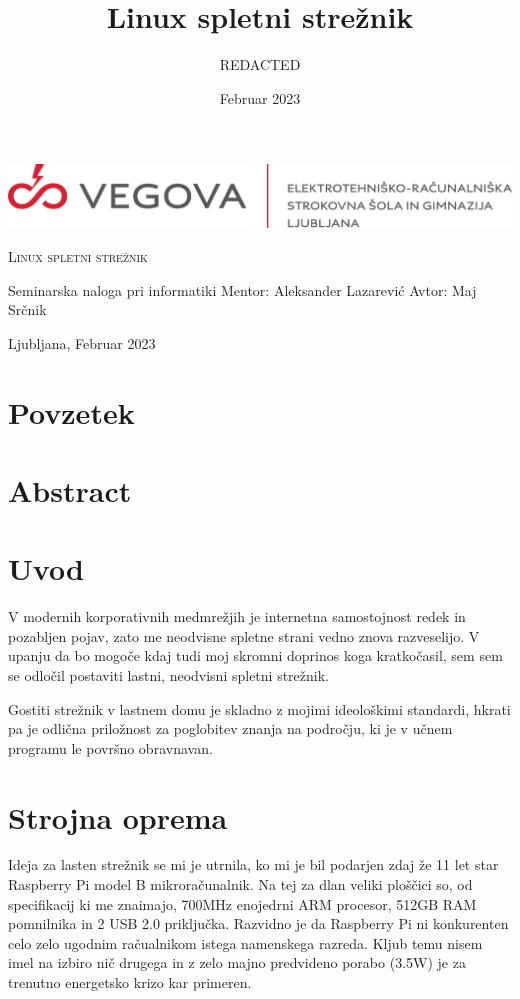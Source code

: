\documentclass[12pt, a4paper]{article}
\title{Linux spletni strežnik}
\author{REDACTED}
\date{Februar 2023}
\affil{Vegova Ljubljana}
\begin{document}
\begin{titlepage}
	\begin{center}
		\includegraphics[width=\textwidth]{slike/logotip_vegova_leze_brezokvirja.png}\par\vspace{6cm}
		{\scshape\huge Linux spletni strežnik}\par
		\large{Seminarska naloga pri informatiki}
		\vfill
		Mentor: Aleksander Lazarević \hfill Avtor: Maj Srčnik\par\vspace{1cm}
		Ljubljana, Februar 2023
	\end{center}
\end{titlepage}
\thispagestyle{empty}
\pagebreak
\tableofcontents
\pagebreak
\thispagestyle{empty}
\section*{Povzetek}
\section*{Abstract}
\pagebreak
\section{Uvod}
V modernih korporativnih medmrežjih je internetna samostojnost redek in pozabljen pojav, zato me neodvisne spletne strani vedno znova razveselijo.
V upanju da bo mogoče kdaj tudi moj skromni doprinos koga kratkočasil, sem sem se odločil postaviti lastni, neodvisni spletni strežnik.

Gostiti strežnik v lastnem domu je skladno z mojimi ideološkimi standardi, hkrati pa je odlična priložnost za poglobitev znanja na področju, ki je v učnem programu le površno obravnavan.

\section{Strojna oprema}
Ideja za lasten strežnik se mi je utrnila, ko mi je bil podarjen zdaj že 11 let star Raspberry Pi model B mikroračunalnik.
Na tej za dlan veliki ploščici so, od specifikacij ki me znaimajo, 700MHz enojedrni ARM procesor, 512GB RAM pomnilnika in 2 USB 2.0 priključka.
Razvidno je da Raspberry Pi ni konkurenten celo zelo ugodnim račualnikom istega namenskega razreda.
Kljub temu nisem imel na izbiro nič drugega in z zelo majno predvideno porabo (3.5W) je za trenutno energetsko krizo kar primeren.
\end{document}
